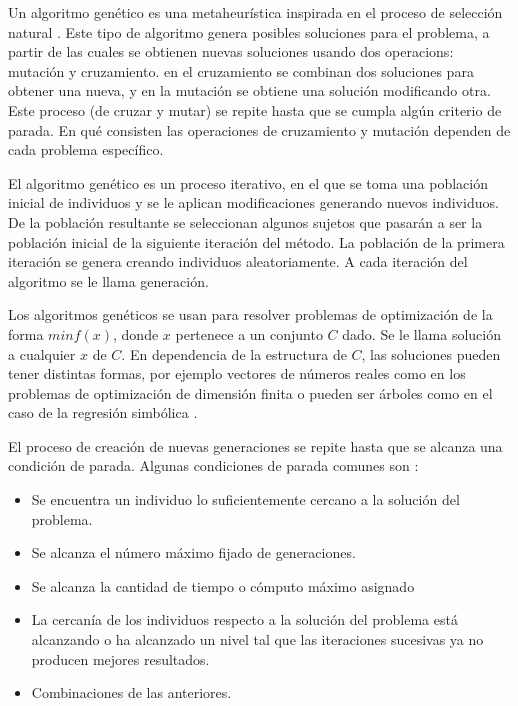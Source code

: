 Un algoritmo genético es una metaheurística inspirada en el proceso de selección natural \cite{mitchell1998introduction}. Este tipo de algoritmo genera posibles soluciones para el problema, a partir de las cuales se obtienen nuevas soluciones usando dos operacions: mutación y cruzamiento. en el cruzamiento se combinan dos soluciones para obtener una nueva, y en la mutación se obtiene una solución modificando otra. Este proceso (de cruzar y mutar) se repite hasta que se cumpla algún criterio de parada. En qué consisten las operaciones de cruzamiento y mutación dependen de cada problema específico.

El algoritmo genético es un proceso iterativo, en el que se toma una población inicial de individuos y se le aplican modificaciones generando nuevos individuos. De la población resultante se seleccionan algunos sujetos que pasarán a ser la población inicial de la siguiente iteración del método. La población de la primera iteración se genera creando individuos aleatoriamente. A cada iteración del algoritmo se le llama generación.

Los algoritmos genéticos se usan para resolver problemas de optimización de la forma $min f(x)$, donde $x$ pertenece a un conjunto $C$ dado. Se le llama solución a cualquier $x$ de $C$. En dependencia de la estructura de $C$, las soluciones pueden tener distintas formas, por ejemplo vectores de números reales como en los problemas de optimización de dimensión finita \cite{mitchell1998introduction} o pueden ser árboles como en el caso de la regresión simbólica \cite{mitchell1998introduction}.

El proceso de creación de nuevas generaciones se repite hasta que se alcanza una condición de parada. Algunas condiciones de parada comunes son \cite{mitchell1998introduction}:

\begin{itemize}
    \item Se encuentra un individuo lo suficientemente cercano a la solución del problema.
    \item Se alcanza el número máximo fijado de generaciones.
    \item Se alcanza la cantidad de tiempo o cómputo máximo asignado
    \item La cercanía de los individuos respecto a la solución del problema está alcanzando o ha alcanzado un nivel tal que las iteraciones sucesivas ya no producen mejores resultados.
    \item Combinaciones de las anteriores.
\end{itemize}

